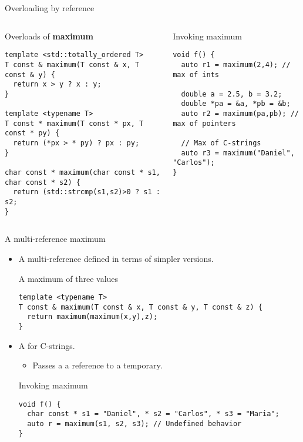 \begin{frame}[t,fragile]{Overloading by reference}

\begin{columns}[T]

\begin{block}{Overloads of \textbf{maximum}}
\begin{lstlisting}
template <std::totally_ordered T>
T const & maximum(T const & x, T const & y) {
  return x > y ? x : y;
}

template <typename T>
T const * maximum(T const * px, T const * py) {
  return (*px > * py) ? px : py;
}

char const * maximum(char const * s1, char const * s2) {
  return (std::strcmp(s1,s2)>0 ? s1 : s2;
}
\end{lstlisting}
\end{block}

\pause
{}
\begin{block}{Invoking maximum}
\begin{lstlisting}
void f() {
  auto r1 = maximum(2,4); // max of ints

  double a = 2.5, b = 3.2;
  double *pa = &a, *pb = &b;
  auto r2 = maximum(pa,pb); // max of pointers

  // Max of C-strings
  auto r3 = maximum("Daniel", "Carlos");
}
\end{lstlisting}
\end{block}

\end{columns}
\end{frame}

\begin{frame}[t,fragile]{A multi-reference maximum}
\begin{itemize}
  \item A multi-reference  defined in terms of simpler versions.

\begin{block}{A maximum of three values}
\begin{lstlisting}
template <typename T>
T const & maximum(T const & x, T const & y, T const & z) {
  return maximum(maximum(x,y),z);
}
\end{lstlisting}
\end{block}

  \item A  for C-strings.
    \begin{itemize}
      \item Passes a a reference to a temporary.
    \end{itemize}

\begin{block}{Invoking maximum}
\begin{lstlisting}
void f() {
  char const * s1 = "Daniel", * s2 = "Carlos", * s3 = "Maria";
  auto r = maximum(s1, s2, s3); // Undefined behavior
}
\end{lstlisting}
\end{block}

\end{itemize}
\end{frame}


